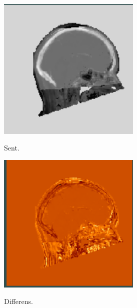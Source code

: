 \begin{figure}
\begin{subfigure}[b]{0.3\textwidth}
    \end{subfigure}\hfill
    \begin{subfigure}[b]{0.3\textwidth}
        \caption{Sent.}
        \includegraphics[width=0.75\textwidth]{colager/over_tid_sct/over_tid_sct_140547_late.png}
        \label{col:over_time_sct_pat2_late}
    \end{subfigure}\hfill
    \begin{subfigure}[b]{0.3\textwidth}
        \caption{Differens.}
        \includegraphics[width=0.75\textwidth]{colager/over_tid_sct/over_tid_sct_140547_sub.png}
        \label{col:over_time_sct_pat2_sub}
    \end{subfigure}\\
    \begin{subfigure}[b]{0.3\textwidth}

\end{subfigure}
\end{figure}
